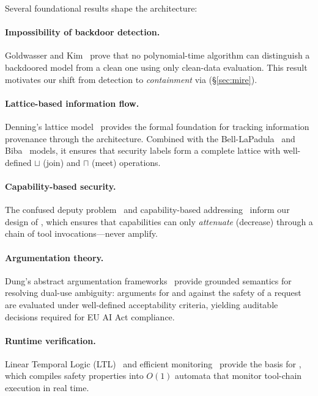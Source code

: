 Several foundational results shape the architecture:

\paragraph{Impossibility of backdoor detection.} Goldwasser and Kim~\cite{goldwasser2022} prove that no polynomial-time algorithm can distinguish a backdoored model from a clean one using only clean-data evaluation. This result motivates our shift from detection to \emph{containment} via \mire (\S\ref{sec:mire}).

\paragraph{Lattice-based information flow.} Denning's lattice model~\cite{denning1976} provides the formal foundation for tracking information provenance through the architecture. Combined with the Bell-LaPadula~\cite{belllapadula1973} and Biba~\cite{biba1977} models, it ensures that security labels form a complete lattice with well-defined $\sqcup$ (join) and $\sqcap$ (meet) operations.

\paragraph{Capability-based security.} The confused deputy problem~\cite{hardy1988} and capability-based addressing~\cite{dennis1966} inform our design of \cafl, which ensures that capabilities can only \emph{attenuate} (decrease) through a chain of tool invocations---never amplify.

\paragraph{Argumentation theory.} Dung's abstract argumentation frameworks~\cite{dung1995} provide grounded semantics for resolving dual-use ambiguity: arguments for and against the safety of a request are evaluated under well-defined acceptability criteria, yielding auditable decisions required for EU AI Act compliance.

\paragraph{Runtime verification.} Linear Temporal Logic (LTL)~\cite{pnueli1977} and efficient monitoring~\cite{havelund2004} provide the basis for \tsa, which compiles safety properties into $O(1)$ automata that monitor tool-chain execution in real time.
